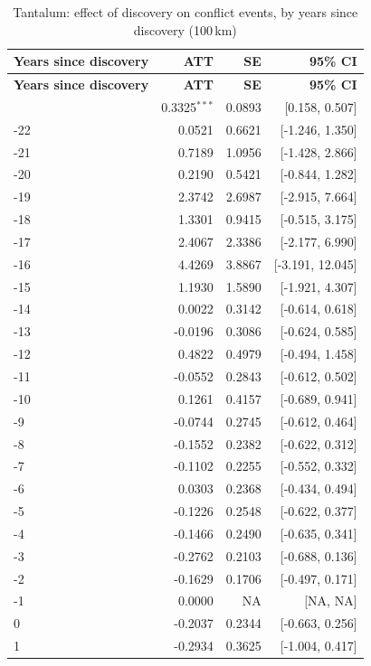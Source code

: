 \begin{longtable}{lrrr}
\caption{Tantalum: effect of discovery on conflict events, by years since discovery (100\,km)} \label{tab:tantalum_all_conflict_events} \\
\toprule
\textbf{Years since discovery} & \textbf{ATT} & \textbf{SE} & \textbf{95\% CI} \\
\midrule \endfirsthead
\toprule
\textbf{Years since discovery} & \textbf{ATT} & \textbf{SE} & \textbf{95\% CI} \\
\midrule \endhead
\bottomrule \endlastfoot
-23 & 0.3325$^{***}$ & 0.0893 & [0.158, 0.507] \\
-22 & 0.0521 & 0.6621 & [-1.246, 1.350] \\
-21 & 0.7189 & 1.0956 & [-1.428, 2.866] \\
-20 & 0.2190 & 0.5421 & [-0.844, 1.282] \\
-19 & 2.3742 & 2.6987 & [-2.915, 7.664] \\
-18 & 1.3301 & 0.9415 & [-0.515, 3.175] \\
-17 & 2.4067 & 2.3386 & [-2.177, 6.990] \\
-16 & 4.4269 & 3.8867 & [-3.191, 12.045] \\
-15 & 1.1930 & 1.5890 & [-1.921, 4.307] \\
-14 & 0.0022 & 0.3142 & [-0.614, 0.618] \\
-13 & -0.0196 & 0.3086 & [-0.624, 0.585] \\
-12 & 0.4822 & 0.4979 & [-0.494, 1.458] \\
-11 & -0.0552 & 0.2843 & [-0.612, 0.502] \\
-10 & 0.1261 & 0.4157 & [-0.689, 0.941] \\
-9 & -0.0744 & 0.2745 & [-0.612, 0.464] \\
-8 & -0.1552 & 0.2382 & [-0.622, 0.312] \\
-7 & -0.1102 & 0.2255 & [-0.552, 0.332] \\
-6 & 0.0303 & 0.2368 & [-0.434, 0.494] \\
-5 & -0.1226 & 0.2548 & [-0.622, 0.377] \\
-4 & -0.1466 & 0.2490 & [-0.635, 0.341] \\
-3 & -0.2762 & 0.2103 & [-0.688, 0.136] \\
-2 & -0.1629 & 0.1706 & [-0.497, 0.171] \\
-1 & 0.0000 & NA & [NA, NA] \\
0 & -0.2037 & 0.2344 & [-0.663, 0.256] \\
1 & -0.2934 & 0.3625 & [-1.004, 0.417] \\

\end{longtable}

